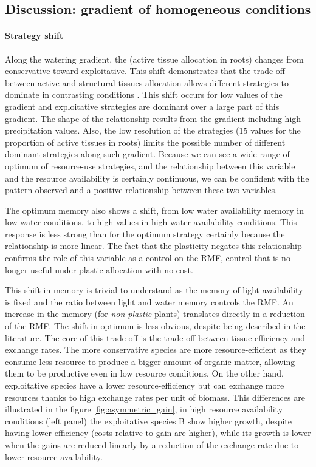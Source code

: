 \subsection{Discussion: gradient of homogeneous conditions}

\paragraph{Strategy shift}
Along the watering gradient, the  (active tissue allocation in roots) changes from conservative toward exploitative. This shift demonstrates that the trade-off between active and structural tissues allocation allows different strategies to dominate in contrasting conditions \parencite{wright_worldwide_2006}. This shift occurs for low values of the gradient and exploitative strategies are dominant over a large part of this gradient. The shape of the relationship results from the gradient including high precipitation values. Also, the low resolution of the strategies (15 values for the proportion of active tissues in roots) limits the possible number of different dominant strategies along such gradient. Because we can see a wide range of optimum of resource-use strategies, and the relationship between this variable and the resource availability is certainly continuous, we can be confident with the pattern observed and a positive relationship between these two variables.

The optimum memory also shows a shift, from low water availability memory in low water conditions, to high values in high water availability conditions. This response is less strong than for the optimum strategy certainly because the relationship is more linear. The fact that the plasticity negates this relationship confirms the role of this variable as a control on the RMF, control that is no longer useful under plastic allocation with no cost.

This shift in memory is trivial to understand as the memory of light availability is fixed and the ratio between light and water memory controls the RMF. An increase in the memory (for \textit{non plastic} plants) translates directly in a reduction of the RMF. The shift in optimum is less obvious, despite being described in the literature. The core of this trade-off is the trade-off between tissue efficiency and exchange rates. The more conservative species are more resource-efficient as they consume less resource to produce a bigger amount of organic matter, allowing them to be productive even in low resource conditions. On the other hand, exploitative species have a lower resource-efficiency but can exchange more resources thanks to high exchange rates per unit of biomass. This differences are illustrated in the figure \ref{fig:asymmetric_gain}, in high resource availability conditions (left panel) the exploitative species B show higher growth, despite having lower efficiency (costs relative to gain are higher), while its growth is lower when the gains are reduced linearly by a reduction of the exchange rate due to lower resource availability. 

